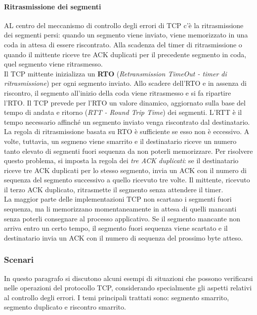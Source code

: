 \documentclass[12pt]{report}
\begin{document}
	\paragraph{Ritrasmissione dei segmenti}
	AL centro del meccanismo di controllo degli errori di TCP c'è la ritrasmissione dei segmenti persi: quando un segmento viene inviato, viene memorizzato in una coda in attesa di essere riscontrato. Alla scadenza del timer di ritrasmissione o quando il mittente riceve tre ACK duplicati per il precedente segmento in coda, quel segmento viene ritrasmesso.
	\vspace{\baselineskip}\\
	Il TCP mittente inizializza un \textbf{RTO} (\textit{Retransmission TimeOut - timer di ritrasmissione}) per ogni segmento inviato. Allo scadere dell'RTO e in assenza di riscontro, il segmento all'inizio della coda viene ritrasmesso e si fa ripartire l'RTO. Il TCP prevede per l'RTO un valore dinamico, aggiornato sulla base del tempo di andata e ritorno (\textit{RTT - Round Trip Time}) dei segmenti. L'RTT è il tempo necessario affinché un segmento inviato venga riscontrato dal destinatario.
	\vspace{\baselineskip}\\
	La regola di ritrasmissione basata su RTO è sufficiente se esso non è eccessivo. A volte, tuttavia, un segmeno viene smarrito e il destinatario riceve un numero tanto elevato di segmenti fuori sequenza da non poterli memorizzare. Per risolvere questo problema, si imposta la regola dei \textit{tre ACK duplicati}: se il destinatario riceve tre ACK duplicati per lo stesso segmento, invia un ACK con il numero di sequenza del segmento successivo a quello ricevuto tre volte. Il mittente, ricevuto il terzo ACK duplicato, ritrasmette il segmento senza attendere il timer.
	\vspace{\baselineskip}\\
	La maggior parte delle implementazioni TCP non scartano i segmenti fuori sequenza, ma li memorizzano momentaneamente in attesa di quelli mancanti senza poterli consegnare al processo applicativo. Se il segmento mancante non arriva entro un certo tempo, il segmento fuori sequenza viene scartato e il destinatario invia un ACK con il numero di sequenza del prossimo byte atteso.

	\subsubsection{Scenari}
	In questo paragrafo si discutono alcuni esempi di situazioni che possono verificarsi nelle operazioni del protocollo TCP, considerando specialmente gli aspetti relativi al controllo degli errori. I temi principali trattati sono: segmento smarrito, segmento duplicato e riscontro smarrito.
\end{document}
